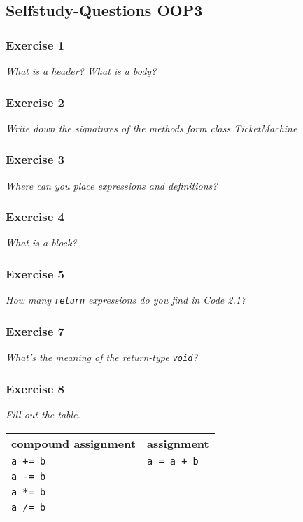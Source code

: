 \subsection{Selfstudy-Questions OOP3}

\subsubsection*{Exercise 1}
\textit{What is a header? What is a body?}\\

\subsubsection*{Exercise 2}
\textit{Write down the signatures of the methods form class
TicketMachine}\\

\subsubsection*{Exercise 3}
\textit{Where can you place expressions and definitions?}\\

\subsubsection*{Exercise 4}
\textit{What is a block?}\\

\subsubsection*{Exercise 5}
\textit{How many \lstinline{return} expressions do you find in Code 2.1?}\\

\subsubsection*{Exercise 7}
\textit{What's the meaning of the return-type \lstinline{void}?}\\

\subsubsection*{Exercise 8}
\textit{Fill out the table.}\\

\begin{table}
\centering
\begin{tabular}{ll}
\textbf{compound assignment} & \textbf{assignment} \\
\lstinline!a += b! & \lstinline!a = a + b! \\
\lstinline!a -= b! & \\
\lstinline!a *= b! & \\
\lstinline!a /= b! & \\
\end{tabular}
\end{table}

